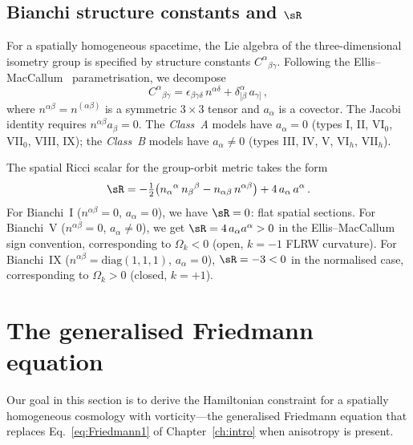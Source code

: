 \subsection{Bianchi structure constants and $\sR$}
\label{sec:bianchi-Rstar}

For a spatially homogeneous spacetime, the Lie algebra of the
three-dimensional isometry group is specified by structure
constants $C^\alpha{}_{\beta\gamma}$.  Following the
Ellis--MacCallum~\cite{EllisMacCallum1969} parametrisation,
we decompose
\begin{equation}\label{eq:struct-decomp}
C^{\alpha}{}_{\beta\gamma}
= \epsilon_{\beta\gamma\delta}\,n^{\alpha\delta}
  + \delta^{\alpha}_{[\beta}\,a_{\gamma]}\,,
\end{equation}
where $n^{\alpha\beta} = n^{(\alpha\beta)}$ is a symmetric
$3\times 3$ tensor and $a_\alpha$ is a covector.  The Jacobi
identity requires $n^{\alpha\beta}a_\beta = 0$.  The
\emph{Class~A} models have $a_\alpha = 0$ (types I, II,
VI$_0$, VII$_0$, VIII, IX); the \emph{Class~B} models have
$a_\alpha \neq 0$ (types III, IV, V, VI$_h$, VII$_h$).

The spatial Ricci scalar for the group-orbit metric takes the
form~\cite{EllisMacCallum1969,RyanShepley1975}
\begin{equation}\label{eq:Rstar-bianchi}
\sR = -\tfrac{1}{2}\bigl(
n_\alpha{}^\alpha\, n_\beta{}^\beta
- n_{\alpha\beta}\,n^{\alpha\beta}\bigr)
+ 4\,a_\alpha\, a^\alpha\,.
\end{equation}
For Bianchi~I ($n^{\alpha\beta} = 0$, $a_\alpha = 0$), we have
$\sR = 0$: flat spatial sections.  For Bianchi~V
($n^{\alpha\beta} = 0$, $a_\alpha \neq 0$), we get
$\sR = 4\,a_\alpha a^\alpha > 0$ in the Ellis--MacCallum sign
convention, corresponding to $\Omega_k < 0$ (open, $k = -1$
FLRW curvature).  For Bianchi~IX
($n^{\alpha\beta} = \mathrm{diag}(1,1,1)$, $a_\alpha = 0$),
$\sR = -3 < 0$ in the normalised case, corresponding to
$\Omega_k > 0$ (closed, $k = +1$).


\section{The generalised Friedmann equation}
\label{sec:gen-friedmann}

Our goal in this section is to derive the Hamiltonian constraint
for a spatially homogeneous cosmology with vorticity---the
generalised Friedmann equation that replaces
Eq.~\eqref{eq:Friedmann1} of Chapter~\ref{ch:intro} when
anisotropy is present.

